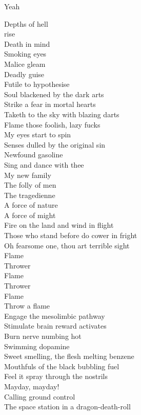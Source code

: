 Yeah \\



Depths of hell \\
 rise \\
Death in mind \\
Smoking eyes \\
Malice gleam \\
Deadly guise \\
Futile to hypothesise \\
Soul blackened by the dark arts \\
Strike a fear in mortal hearts \\
Taketh to the sky with blazing darts \\
Flame those foolish, lazy fucks \\

My eyes start to spin \\
Senses dulled by the original sin \\
Newfound gasoline \\
Sing and dance with thee \\
My new family \\
The folly of men \\
The tragedienne \\
A force of nature \\
A force of might \\
Fire on the land and wind in flight \\
Those who stand before do cower in fright \\
Oh fearsome one, thou art terrible sight \\

Flame \\
Thrower \\
Flame \\
Thrower \\
Flame \\
Throw a flame \\

Engage the mesolimbic pathway \\
Stimulate brain reward activates \\
Burn nerve numbing hot \\
Swimming dopamine \\
Sweet smelling, the flesh melting benzene \\
Mouthfuls of the black bubbling fuel \\
Feel it spray through the  nostrils \\
Mayday, mayday! \\
Calling ground control \\
The space station in a dragon-death-roll \\


